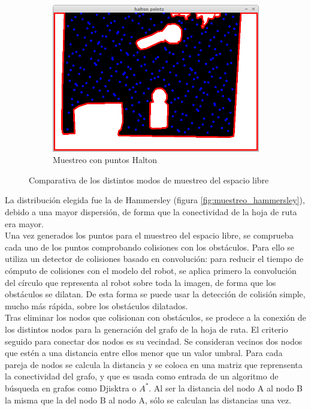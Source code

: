 \begin{figure}[h]
\begin{subfigure}[b]{0.3\textwidth}
         	   \centering
                \includegraphics[width=\textwidth]{images/halton-beer.png}
                \caption{Muestreo con puntos Halton}
                \label{fig:muestreo_halton}
        \end{subfigure}
        \caption{Comparativa de los distintos modos de muestreo del espacio libre}\label{fig:muestreo}
\end{figure}

La distribución elegida fue la de Hammersley (figura \ref{fig:muestreo_hammersley}), debido a una mayor dispersión, de forma que la conectividad de la hoja de ruta era mayor.\\

Una vez generados los puntos para el muestreo del espacio libre, se comprueba cada uno de los puntos comprobando colisiones con los obstáculos. Para ello se utiliza un detector de colisiones basado en convolución: para reducir el tiempo de cómputo de colisiones con el modelo del robot, se aplica primero la convolución del círculo que representa al robot sobre toda la imagen, de forma que los obstáculos se dilatan. De esta forma se puede usar la detección de colisión simple, mucho más rápida, sobre los obstáculos dilatados.\\

Tras eliminar los nodos que colisionan con obstáculos, se prodece a la conexión de los distintos nodos para la generación del grafo de la hoja de ruta. El criterio seguido para conectar dos nodos es su vecindad. Se consideran vecinos dos nodos que estén a una distancia entre ellos menor que un valor umbral. Para cada pareja de nodos se calcula la distancia y se coloca en una matriz que reprensenta la conectividad del grafo, y que es usada como entrada de un algoritmo de búsqueda en grafos como Djisktra o $A^*$. Al ser la distancia del nodo A al nodo B la misma que la del nodo B al nodo A, sólo se calculan las distancias una vez.\\

